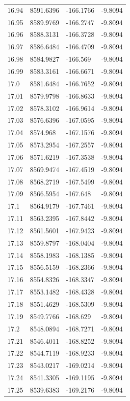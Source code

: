 \begin{table}[H]
\begin{tabular}{llll}
16.94 & 8591.6396 & -166.1766 & -9.8094 \\
16.95 & 8589.9769 & -166.2747 & -9.8094 \\
16.96 & 8588.3131 & -166.3728 & -9.8094 \\
16.97 & 8586.6484 & -166.4709 & -9.8094 \\
16.98 & 8584.9827 & -166.569 & -9.8094 \\
16.99 & 8583.3161 & -166.6671 & -9.8094 \\
17.0 & 8581.6484 & -166.7652 & -9.8094 \\
17.01 & 8579.9798 & -166.8633 & -9.8094 \\
17.02 & 8578.3102 & -166.9614 & -9.8094 \\
17.03 & 8576.6396 & -167.0595 & -9.8094 \\
17.04 & 8574.968 & -167.1576 & -9.8094 \\
17.05 & 8573.2954 & -167.2557 & -9.8094 \\
17.06 & 8571.6219 & -167.3538 & -9.8094 \\
17.07 & 8569.9474 & -167.4519 & -9.8094 \\
17.08 & 8568.2719 & -167.5499 & -9.8094 \\
17.09 & 8566.5954 & -167.648 & -9.8094 \\
17.1 & 8564.9179 & -167.7461 & -9.8094 \\
17.11 & 8563.2395 & -167.8442 & -9.8094 \\
17.12 & 8561.5601 & -167.9423 & -9.8094 \\
17.13 & 8559.8797 & -168.0404 & -9.8094 \\
17.14 & 8558.1983 & -168.1385 & -9.8094 \\
17.15 & 8556.5159 & -168.2366 & -9.8094 \\
17.16 & 8554.8326 & -168.3347 & -9.8094 \\
17.17 & 8553.1482 & -168.4328 & -9.8094 \\
17.18 & 8551.4629 & -168.5309 & -9.8094 \\
17.19 & 8549.7766 & -168.629 & -9.8094 \\
17.2 & 8548.0894 & -168.7271 & -9.8094 \\
17.21 & 8546.4011 & -168.8252 & -9.8094 \\
17.22 & 8544.7119 & -168.9233 & -9.8094 \\
17.23 & 8543.0217 & -169.0214 & -9.8094 \\
17.24 & 8541.3305 & -169.1195 & -9.8094 \\
17.25 & 8539.6383 & -169.2176 & -9.8094 \\

\end{tabular}
\end{table}
